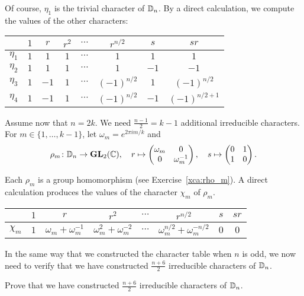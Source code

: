 Of course, $\eta_1$ is the trivial character of $\mathbb{D}_n$. 
By a direct calculation, we compute the values of the other characters: 
\bigskip 
\begin{center}
    \begin{tabular}{|c|ccccccc|}
         \hline 
         & $1$ & $r$ & $r^2$ & $\cdots$  & $r^{n/2}$ & $s$ & $sr$\\
         \hline 
         $\eta_1$ & $1$ & $1$ & $1$ & $\cdots$ & $1$ & $1$ & $1$\\
         $\eta_2$ & $1$ & $1$ & $1$ & $\cdots$ & $1$ & $-1$ & $-1$ \\
         $\eta_3$ & $1$ & $-1$ & $1$ & $\cdots$ & $(-1)^{n/2}$ & $1$ & $(-1)^{n/2}$ \\
         $\eta_4$ & $1$ & $-1$ & $1$ & $\cdots$ & $(-1)^{n/2}$ & $-1$ & $(-1)^{n/2+1}$\\
         \hline 
    \end{tabular}
\end{center}
\bigskip 

Assume now that $n=2k$. 
We need $\frac{n-1}{2}=k-1$ additional irreducible characters. For 
$m\in\{1,\dots,k-1\}$, let $\omega_m=e^{2\pi im/k}$ and 
\[
\rho_m\colon\mathbb{D}_n\to\mathbf{GL}_2(\mathbb{C}),\quad 
r\mapsto\begin{pmatrix}\omega_m&0\\0&\omega_m^{-1}\end{pmatrix},\quad 
s\mapsto\begin{pmatrix}0&1\\1&0\end{pmatrix}.
\]

Each $\rho_m$ is a group homomorphism (see Exercise~\ref{xca:rho_m}). 
A direct calculation produces the values of the 
character $\chi_m$ of $\rho_m$.

\bigskip 
\begin{center}
    \begin{tabular}{|c|ccccccc|}
         \hline 
         & $1$ & $r$ & $r^2$ & $\cdots$  & $r^{n/2}$ & $s$ & $sr$\\
         \hline 
         $\chi_m$ & $1$ & $\omega_m+\omega_m^{-1}$ & $\omega_m^2+\omega_m^{-2}$ & $\cdots$ & $\omega_m^{n/2}+\omega_m^{-n/2}$ & $0$ & $0$\\
         \hline 
    \end{tabular}
\end{center}
\bigskip 

In the same way that we constructed the character table when $n$ is odd, 
we now need to verify that we have constructed 
$\frac{n+6}{2}$ irreducible characters of $\mathbb{D}_n$. 

\begin{exercise}
    Prove that we have constructed $\frac{n+6}{2}$ irreducible characters of $\mathbb{D}_n$. 
\end{exercise}